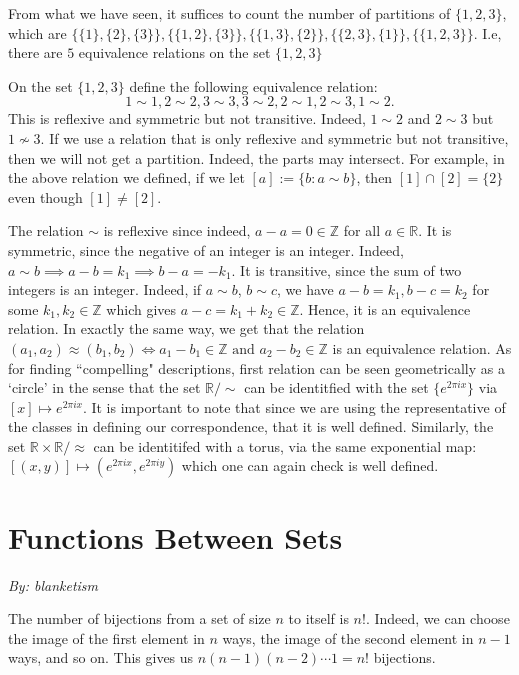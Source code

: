 \exercise From what we have seen, it suffices to count the number of partitions of $\{1,2,3\}$, which are $\{\{1\},\{2\},\{3\}\}, \{\{1,2\},\{3\}\}, \{\{1,3\},\{2\}\}, \{\{2,3\},\{1\}\}, \{\{1,2,3\}\}$. I.e, there are $5$ equivalence relations on the set $\{1,2,3\}$

\exercise On the set $\{1,2,3\}$ define the following equivalence relation: \[1\sim 1, 2\sim 2, 3\sim 3, 3\sim 2, 2\sim 1, 2\sim 3, 1\sim 2.\] This is reflexive and symmetric but not transitive. Indeed, $1\sim 2$ and $2\sim 3$ but $1\not\sim 3$. If we use a relation that is only reflexive and symmetric but not transitive, then we will not get a partition. Indeed, the parts may intersect. For example, in the above relation we defined, if we let $[a] := \{b: a\sim b\}$, then $[1]\cap [2] = \{2\}$ even though $[1]\neq [2]$.

\exercise The relation $\sim$ is reflexive since indeed, $a - a = 0\in \mathbb{Z}$ for all $a\in \mathbb{R}$. It is symmetric, since the negative of an integer is an integer. Indeed, $a\sim b \implies a-b = k_1 \implies b-a = -k_1$. It is transitive, since the sum of two integers is an integer. Indeed, if $a\sim b$, $b\sim c$, we have $a-b = k_1, b-c = k_2$ for some $k_1,k_2\in \mathbb{Z}$ which gives $a - c = k_1 + k_2\in\mathbb{Z}$. Hence, it is an equivalence relation. In exactly the same way, we get that the relation $(a_1,a_2) \approx (b_1,b_2)\iff a_1 - b_1\in\mathbb{Z}\text{ and }a_2 - b_2\in \mathbb{Z}$ is an equivalence relation.\newline
As for finding ``compelling" descriptions, first relation can be seen geometrically as a `circle' in the sense that the set $\mathbb{R}/\sim$ can be identitfied with the set $\{e^{2\pi i x}\}$ via $[x]\mapsto e^{2\pi i x}$. It is important to note that since we are using the representative of the classes in defining our correspondence, that it is well defined. Similarly, the set $\mathbb{R}\times\mathbb{R}/\approx$ can be identitifed with a torus, via the same exponential map: $[(x,y)] \mapsto (e^{2\pi i x}, e^{2\pi i y})$ which one can again check is well defined.

\section{Functions Between Sets}
\emph{By: blanketism}

\exercise The number of bijections from a set of size $n$ to itself is $n!$. Indeed, we can choose the image of the first element in $n$ ways, the image of the second element in $n-1$ ways, and so on. This gives us $n(n-1)(n-2)\cdots 1 = n!$ bijections.

